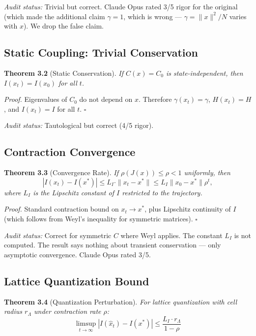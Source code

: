 \documentclass[11pt]{article}
\begin{document}
\textit{Audit status:} Trivial but correct. Claude Opus rated 3/5 rigor for the original (which made the additional claim $\gamma = 1$, which is wrong --- $\gamma = \|x\|^2/N$ varies with $x$). We drop the false claim.

\subsection{Static Coupling: Trivial Conservation}

\textbf{Theorem 3.2} (Static Conservation). \textit{If $C(x) = C_0$ is state-independent, then $I(x_t) = I(x_0)$ for all $t$.}

\textit{Proof.} Eigenvalues of $C_0$ do not depend on $x$. Therefore $\gamma(x_t) = \gamma$, $H(x_t) = H$, and $I(x_t) = I$ for all $t$. $\square$

\textit{Audit status:} Tautological but correct (4/5 rigor).

\subsection{Contraction Convergence}

\textbf{Theorem 3.3} (Convergence Rate). \textit{If $\rho(J(x)) \leq \rho < 1$ uniformly, then
\begin{equation}
  |I(x_t) - I(x^*)| \leq L_I \cdot \|x_t - x^*\| \leq L_I \|x_0 - x^*\| \rho^t,
\end{equation}
where $L_I$ is the Lipschitz constant of $I$ restricted to the trajectory.}

\textit{Proof.} Standard contraction bound on $x_t \to x^*$, plus Lipschitz continuity of $I$ (which follows from Weyl's inequality for symmetric matrices). $\square$

\textit{Audit status:} Correct for symmetric $C$ where Weyl applies. The constant $L_I$ is not computed. The result says nothing about transient conservation --- only asymptotic convergence. Claude Opus rated 3/5.

\subsection{Lattice Quantization Bound}

\textbf{Theorem 3.4} (Quantization Perturbation). \textit{For lattice quantization with cell radius $r_\Lambda$ under contraction rate $\rho$:
\begin{equation}
  \limsup_{t \to \infty} |I(\hat{x}_t) - I(x^*)| \leq \frac{L_I \cdot r_\Lambda}{1 - \rho}
\end{equation}}
\end{document}
